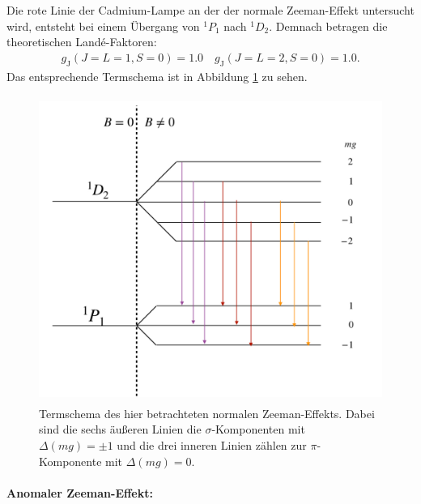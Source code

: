 Die rote Linie der Cadmium-Lampe an der der normale Zeeman-Effekt untersucht wird, entsteht bei einem Übergang von $^1P_1$ nach $^1D_2$. Demnach betragen die theoretischen Landé-Faktoren:
\begin{align}
  g_\text{J}(J=L=1, S=0) = \num{1.0} \quad g_\text{J}(J=L=2, S=0) = \num{1.0}.
\end{align}
Das entsprechende Termschema ist in Abbildung \ref{fig:normalTermschema}  zu sehen.
\begin{figure}
  \centering
  \includegraphics[height=10cm]{besuchInDerNacktmullAufzuchtstation/normalTermschema.pdf}
  \caption{Termschema des hier betrachteten normalen Zeeman-Effekts. Dabei sind die sechs äußeren Linien die $\sigma$-Komponenten mit $\Delta (mg) = \pm 1$ und die drei inneren Linien zählen zur $\pi$-Komponente mit $\Delta (mg) =  0$.}
  \label{fig:normalTermschema}
\end{figure}


\paragraph{Anomaler Zeeman-Effekt:}

